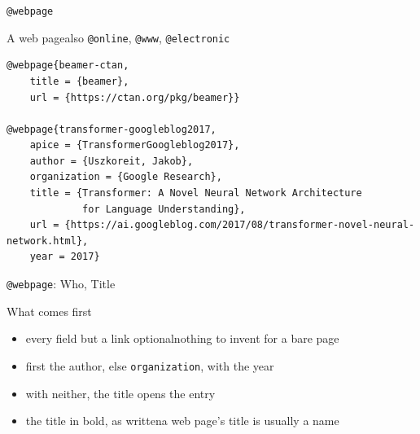 \documentclass[presentation,\almamaterseal,apice]{beamer}\mode<presentation>{\usetheme{\almamaterpreset}}
\begin{document}
\begin{frame}[c,fragile]{\texttt{@webpage}}
%
\begin{block}{A web page\textemdash{}also \texttt{@online}, \texttt{@www}, \texttt{@electronic}}
{\tiny\begin{verbatim}
@webpage{beamer-ctan,
    title = {beamer},
    url = {https://ctan.org/pkg/beamer}}

@webpage{transformer-googleblog2017,
    apice = {TransformerGoogleblog2017},
    author = {Uszkoreit, Jakob},
    organization = {Google Research},
    title = {Transformer: A Novel Neural Network Architecture
             for Language Understanding},
    url = {https://ai.googleblog.com/2017/08/transformer-novel-neural-network.html},
    year = 2017}
\end{verbatim}} %
\end{block}
%
\end{frame}

\begin{frame}[c]{\texttt{@webpage}: Who, Title}
%
\begin{block}{What comes first}
\begin{itemize}
	\item every field but a link optional\textemdash{}nothing to invent for a bare page
	\item first the author, else \texttt{organization}, with the year
	\item with neither, the title opens the entry
	\item the title in bold, \alert{as written}\textemdash{}a web page's title is usually a name
\end{itemize}
\end{block}
%
\end{frame}
\end{document}
